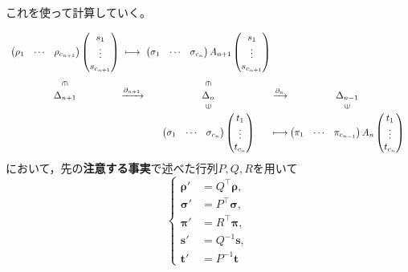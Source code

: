 \documentclass[uplatex]{jsarticle}
\begin{document}
これを使って計算していく。

\begin{equation}
  \begin{array}{c@{\:}c@{\:}c@{\:}c@{\:}c}
    \begin{pmatrix}
      \rho_{1} & \cdots & \rho_{c_{n+1}}
    \end{pmatrix}
    \begin{pmatrix}
      s_{1} \\ \vdots \\ s_{c_{n+1}}
    \end{pmatrix}
    & \longmapsto &
    \begin{pmatrix}
      \sigma_{1} & \cdots & \sigma_{c_{n}}
    \end{pmatrix}
    A_{n+1}
    \begin{pmatrix}
      s_{1} \\ \vdots \\ s_{c_{n+1}}
    \end{pmatrix} \\
    \rotatebox{270}{$\in$} & & \rotatebox{270}{$\in$} \\
    \Delta_{n+1} & \xrightarrow{\partial_{n+1}} & \Delta_{n} & \xrightarrow{\partial_{n}} & \Delta_{n-1} \\
    & & \vin & & \vin \\
    & & \begin{pmatrix}
      \sigma_{1} & \cdots & \sigma_{c_{n}}
    \end{pmatrix}
    \begin{pmatrix}
      t_{1} \\ \vdots \\ t_{c_{n}}
    \end{pmatrix}
    & \longmapsto &
    \begin{pmatrix}
      \pi_{1} & \cdots & \pi_{c_{n-1}}
    \end{pmatrix}
    A_{n}
    \begin{pmatrix}
      t_{1} \\ \vdots \\ t_{c_{n}}
    \end{pmatrix} \\
  \end{array}
\end{equation}
において，先の\textbf{注意する事実}で述べた行列$P,Q,R$を用いて
\begin{equation}
  \left\{ \begin{split}
    \bm{\rho}' &= Q^{\top} \bm{\rho}, \\
    \bm{\sigma}' &= P^{\top} \bm{\sigma}, \\
    \bm{\pi}' &= R^{\top} \bm{\pi}, \\
    \bm{s}' &= Q^{-1} \bm{s}, \\
    \bm{t}' &= P^{-1} \bm{t}
  \end{split} \right.
\end{equation}
\end{document}
